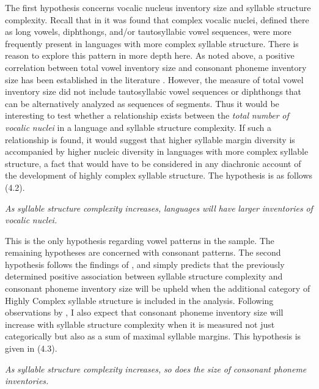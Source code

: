   The first hypothesis concerns vocalic nucleus inventory size and syllable structure complexity. Recall that in  it was found that complex vocalic nuclei, defined there as long vowels, diphthongs, and/or tautosyllabic vowel sequences, were more frequently present in languages with more complex syllable structure. There is reason to explore this pattern in more depth here. As noted above, a positive correlation between total vowel inventory size and consonant phoneme inventory size has been established in the literature \citep{Maddieson2011}. However, the measure of total vowel inventory size did not include tautosyllabic vowel sequences or diphthongs that can be alternatively analyzed as sequences of segments. Thus it would be interesting to test whether a relationship exists between the \textit{total} \textit{number} \textit{of} \textit{vocalic} \textit{nuclei} in a language and syllable structure complexity. If such a relationship is found, it would suggest that higher syllable margin diversity is accompanied by higher nucleic diversity in languages with more complex syllable structure, a fact that would have to be considered in any diachronic account of the development of highly complex syllable structure. The hypothesis is as follows (4.2).



\ea\label{ex:(4.2)}
  \textit{As} \textit{syllable} \textit{structure} \textit{complexity} \textit{increases,} \textit{languages} \textit{will} \textit{have} \textit{larger} \textit{inventories} \textit{of} \textit{vocalic} \textit{nuclei.}
\z



  This is the only hypothesis regarding vowel patterns in the sample. The remaining hypotheses are concerned with consonant patterns. The second hypothesis follows the findings of \citet{Maddieson2006}, and simply predicts that the previously determined positive association between syllable structure complexity and consonant phoneme inventory size will be upheld when the additional category of Highly Complex syllable structure is included in the analysis. Following observations by \citet{Gordon2016}, I also expect that consonant phoneme inventory size will increase with syllable structure complexity when it is measured not just categorically but also as a sum of maximal syllable margins. This hypothesis is given in (4.3).



\ea\label{ex:(4.3)}
  \textit{As} \textit{syllable} \textit{structure} \textit{complexity} \textit{increases,} \textit{so} \textit{does} \textit{the} \textit{size} \textit{of} \textit{consonant} \textit{phoneme} \textit{inventories.}
\z



